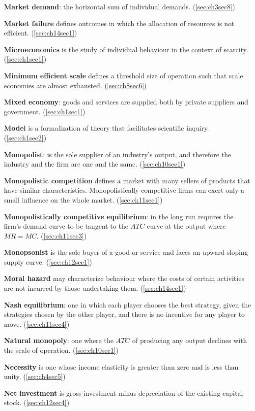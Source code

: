 \textbf{Market demand}: the horizontal sum of individual demands. (\ref{sec:ch3sec8})

\textbf{Market failure} defines outcomes in which the allocation of resources is not efficient. (\ref{sec:ch14sec1})

\textbf{Microeconomics} is the study of individual behaviour in the context of scarcity. (\ref{sec:ch1sec1})

\textbf{Minimum efficient scale} defines a threshold size of operation such that scale economies are almost exhausted. (\ref{sec:ch8sec6})

\textbf{Mixed economy}: goods and services are supplied both by private suppliers and government. (\ref{sec:ch1sec1})

\textbf{Model} is a formalization of theory that facilitates scientific inquiry. (\ref{sec:ch1sec2})

\textbf{Monopolist}: is the sole supplier of an industry's output, and therefore the industry and the firm are one and the same. (\ref{sec:ch10sec1})

\textbf{Monopolistic competition} defines a market with many sellers of products that have similar characteristics. Monopolistically competitive firms can exert only a small influence on the whole market. (\ref{sec:ch11sec1})

\textbf{Monopolistically competitive equilibrium}: in the long run requires the firm's demand curve to be tangent to the $ATC$ curve at the output where $MR=MC$. (\ref{sec:ch11sec3})

\textbf{Monopsonist} is the sole buyer of a good or service and faces an upward-sloping supply curve. (\ref{sec:ch12sec1})

\textbf{Moral hazard} may characterize behaviour where the costs of certain activities are not incurred by those undertaking them. (\ref{sec:ch14sec1})

\textbf{Nash equilibrium}: one in which each player chooses the best strategy, given the strategies chosen by the other player, and there is no incentive for any player to move. (\ref{sec:ch11sec4})

\textbf{Natural monopoly}: one where the $ATC$ of producing any output declines with the scale of operation. (\ref{sec:ch10sec1})

\textbf{Necessity} is one whose income elasticity is greater than zero and is less than unity. (\ref{sec:ch4sec5})

\textbf{Net investment} is gross investment minus depreciation of the existing capital stock. (\ref{sec:ch12sec4})

